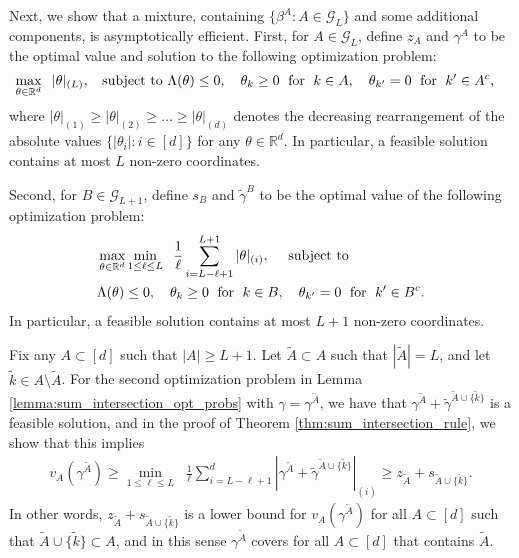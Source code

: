 \documentclass[aap,preprint]{imsart}
\newcommand{\bR}{{\mathbb{R}}}
\theoremstyle{plain}
\theoremstyle{definition}
\begin{document}
 

Next, we show that a mixture, containing $\{\beta^{A}: A \in \mathcal{G}_L \}$ and some additional components, is asymptotically efficient. First, for $A \in \mathcal{G}_L$, define $z_A$ and $\gamma^A$ to be the optimal value and solution to the following optimization problem:
\begin{align}\label{opt:sum-inter_L}
\begin{split}
& \max_{\theta \in \bR^d} \;\; |\theta|_{(L)}, \;\; \textup{ subject to }  \Lambda(\theta) \leq 0, \quad \theta_k \geq 0 \;\text{ for }\; k \in A, \quad \theta_{k'} = 0 \;\text{ for }\; k' \in A^c,
\end{split}
\end{align}
where  $|\theta|_{(1)} \geq |\theta|_{(2)} \geq \ldots \geq |\theta|_{(d)}$ denotes the decreasing rearrangement of the absolute values $\{|\theta_i|: i \in [d]\}$ for any $\theta \in \bR^d$. In particular, a feasible solution contains at most $L$ non-zero coordinates.

Second,  for $B \in \mathcal{G}_{L+1}$, define $s_B$ and $\tilde{\gamma}^B$ to be the optimal value of the following optimization problem:
\begin{align}\label{opt:sum-inter_L_1}
\begin{split}
& \max_{\theta \in \bR^d} \min_{1 \leq \ell \leq L} \;\; \frac{1}{\ell} \sum_{i = L - \ell + 1}^{L+1} |\theta|_{(i)}, \quad \textup{ subject to } \\
& \Lambda(\theta) \leq 0, \quad \theta_k \geq 0 \;\text{ for }\; k \in B, \quad \theta_{k'} = 0 \;\text{ for }\; k' \in B^c.
\end{split}
\end{align}
In particular, a feasible solution contains at most $L+1$ non-zero coordinates.

Fix any $A \subset [d]$ such that $|A| \geq L+1$. Let $\tilde{A} \subset A$ such that $|\tilde{A}| = L$, and let $\tilde{k} \in A \setminus \tilde{A}$. For the second optimization problem in Lemma \ref{lemma:sum_intersection_opt_probs} with $\gamma = \gamma^{\tilde{A}}$, we have that $\gamma^{\tilde{A}} + \tilde{\gamma}^{\tilde{A}\cup \{\tilde{k}\}}$ is a feasible solution, and in the proof of Theorem \ref{thm:sum_intersection_rule}, we show that this implies
\begin{align*}
    v_{A}(\gamma^{\tilde{A}}) \geq   \min_{1 \leq \ell \leq L} \;\; \frac{1}{\ell} \sum_{i = L - \ell + 1}^{d} \left|\gamma^{\tilde{A}} + \tilde{\gamma}^{\tilde{A}\cup \{\tilde{k}\}}\right|_{(i)} \geq z_{\tilde{A}} + s_{\tilde{A} \cup \{\tilde{k}\}}.
\end{align*}
In other words, $z_{\tilde{A}} + s_{\tilde{A} \cup \{\tilde{k}\}}$ is a lower bound for $ v_{A}(\gamma^{\tilde{A}}) $ for all $A \subset [d]$ such that $\tilde{A} \cup \{\tilde{k}\} \subset A$, and in this sense $\gamma^{\tilde{A}}$ covers for all $A \subset [d]$ that contains $\tilde{A}$.
\end{document}
